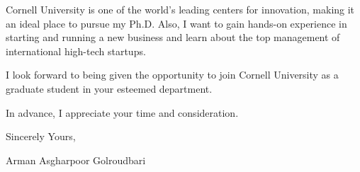 \documentclass[a4,25pt]{article}
\begin{document}
\begin{large}
\vspace{-0.25cm} \quad Cornell University is one of the world's leading centers for innovation, making it an ideal place to pursue my Ph.D. Also, I want to gain hands-on experience in starting and running a new business and learn about the top management of international high-tech startups. \par
I look forward to being given the opportunity to join Cornell University as a graduate student in your esteemed department.\par
In advance, I appreciate your time and consideration. \par
\vspace{-0.4cm} Sincerely Yours, \par
\vspace{-0.4cm}Arman Asgharpoor Golroudbari \par

\end{large}

\small

\end{document}
